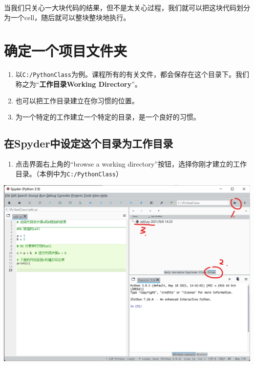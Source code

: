 \documentclass[
]{book}
\providecommand{\tightlist}{%
  \setlength{\itemsep}{0pt}\setlength{\parskip}{0pt}}
\begin{document}
当我们只关心一大块代码的结果，但不是太关心过程，我们就可以把这块代码划分为一个cell，随后就可以整块整块地执行。

\hypertarget{ux786eux5b9aux4e00ux4e2aux9879ux76eeux6587ux4ef6ux5939}{%
\section{确定一个项目文件夹}\label{ux786eux5b9aux4e00ux4e2aux9879ux76eeux6587ux4ef6ux5939}}

\begin{enumerate}
\def\labelenumi{\arabic{enumi}.}
\tightlist
\item
  以\texttt{C:/PythonClass}为例。课程所有的有关文件，都会保存在这个目录下。我们称之为``\textbf{工作目录Working Directory}''。
\item
  也可以把工作目录建立在你习惯的位置。
\item
  为一个特定的工作建立一个特定的目录，是一个良好的习惯。
\end{enumerate}

\hypertarget{ux5728spyderux4e2dux8bbeux5b9aux8fd9ux4e2aux76eeux5f55ux4e3aux5de5ux4f5cux76eeux5f55}{%
\subsection{在Spyder中设定这个目录为工作目录}\label{ux5728spyderux4e2dux8bbeux5b9aux8fd9ux4e2aux76eeux5f55ux4e3aux5de5ux4f5cux76eeux5f55}}

\begin{enumerate}
\def\labelenumi{\arabic{enumi}.}
\tightlist
\item
  点击界面右上角的``browse a working directory''按钮，选择你刚才建立的工作目录。（本例中为\texttt{C:/PythonClass}）
\end{enumerate}

\includegraphics{images/btn_setwd.png}
\end{document}

